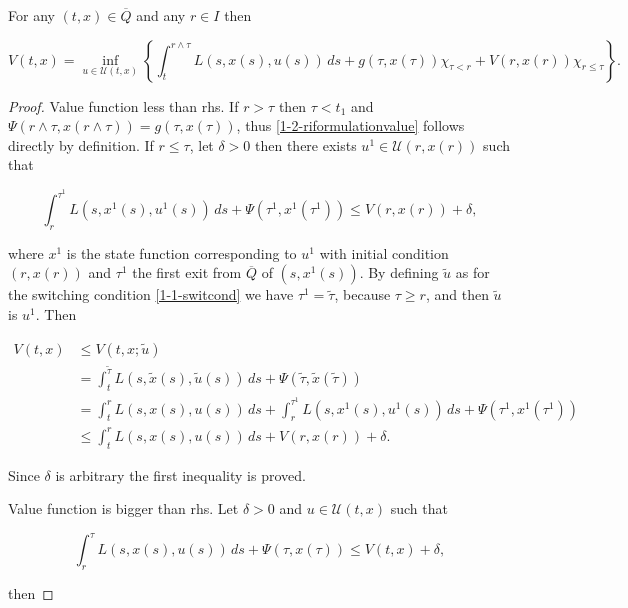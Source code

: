 \begin{proposition}\label{1-2-propriformulation}
    For any $(t,x)\in\overline{Q}$ and any $r\in I$ then

    \begin{equation}\label{1-2-riformulationvalue}
        V(t,x)=\inf_{u\in\mathcal{U}(t,x)}\left\{\int_t^{r\land\tau}L(s,x(s),u(s))\,ds+g(\tau,x(\tau))\chi_{\tau<r}+V(r,x(r))\chi_{r\leq\tau}\right\}.
    \end{equation}

    \begin{proof}
        Value function less than rhs. If $r>\tau$ then $\tau<t_1$ and $\Psi(r\land\tau,x(r\land\tau))=g(\tau,x(\tau))$, thus \eqref{1-2-riformulationvalue}
        follows directly by definition. If $r\leq\tau$, let $\delta>0$ then there exists $u^1\in\mathcal{U}(r,x(r))$ such that

        \[\int_r^{\tau^1}L(s,x^1(s),u^1(s))\,ds+\Psi(\tau^1,x^1(\tau^1))\leq V(r,x(r))+\delta,\]

        where $x^1$ is the state function corresponding to $u^1$ with initial condition $(r,x(r))$ and $\tau^1$ the first exit from $\overline{Q}$ of $(s,x^1(s))$.  
        By defining $\tilde{u}$ as for the switching condition \eqref{1-1-switcond} we have $\tau^1=\tilde{\tau}$, because $\tau\geq r$, and then $\tilde{u}$ is $u^1$. Then
        
        \begin{align*}
            V(t,x) & \leq V(t,x;\tilde{u}) \\
            & = \int_t^{\tilde{\tau}} L(s,\tilde{x}(s),\tilde{u}(s))\,ds+\Psi(\tilde{\tau},\tilde{x}(\tilde{\tau})) \\
            & = \int_t^{r} L(s,x(s),u(s))\,ds+\int_r^{\tau^1} L(s,x^1(s),u^1(s))\,ds+\Psi(\tau^1,x^1(\tau^1)) \\
            & \leq \int_t^{r} L(s,x(s),u(s))\,ds + V(r,x(r)) + \delta.
        \end{align*}

    Since $\delta$ is arbitrary the first inequality is proved.
    
    \noindent Value function is bigger than rhs. Let $\delta>0$ and $u\in\mathcal{U}(t,x)$ such that

    \[\int_r^{\tau}L(s,x(s),u(s))\,ds+\Psi(\tau,x(\tau))\leq V(t,x)+\delta,\]

    then 


\end{proof}
\end{proposition}
